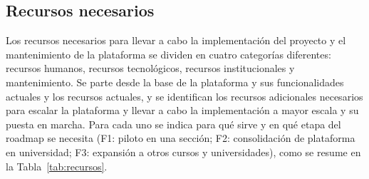 \documentclass[letterpaper, 10 pt, conference]{ieeeconf}
\begin{document}
\subsection{Recursos necesarios}
Los recursos necesarios para llevar a cabo la implementación del proyecto y el mantenimiento de la plataforma se dividen en cuatro categorías diferentes: recursos humanos, recursos tecnológicos, recursos institucionales y mantenimiento.
Se parte desde la base de la plataforma y sus funcionalidades actuales y los recursos actuales, y se identifican los recursos adicionales necesarios para escalar la plataforma y llevar a cabo la implementación a mayor escala y su puesta en marcha.
Para cada uno se indica para qué sirve y en qué etapa del roadmap se necesita (F1: piloto en una sección; F2: consolidación de plataforma en universidad; F3: expansión a otros cursos y universidades), como se resume en la Tabla~\ref{tab:recursos}.
\end{document}
